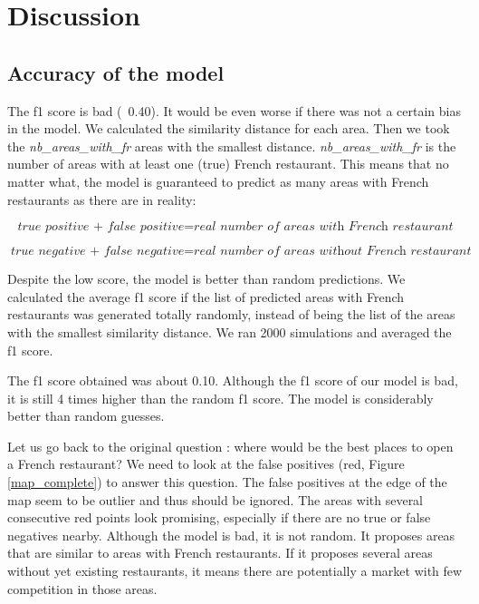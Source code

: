 \documentclass[12pt,a4paper]{article}
\begin{document}
\section{Discussion}

\subsection{Accuracy of the model}

The f1 score is bad (~0.40). It would be even worse if there was not a certain bias in the model. We calculated the similarity distance for each area. Then we took the \textit{nb\_areas\_with\_fr} areas with the smallest distance. \textit{nb\_areas\_with\_fr} is the number of areas with at least one (true) French restaurant. This means that no matter what, the model is guaranteed to predict as many areas with French restaurants as there are in reality:

\begin{equation}
	\textit{true positive + false positive} =  \textit{real number of areas with French restaurant}
\end{equation}

\begin{equation}
	\textit{true negative + false negative} =  \textit{real number of areas without French restaurant}
\end{equation}

Despite the low score, the model is better than random predictions. We calculated the average f1 score if the list of predicted areas with French restaurants was generated totally randomly, instead of being the list of the areas with the smallest similarity distance. We ran 2000 simulations and averaged the f1 score.

\medskip

The f1 score obtained was about 0.10. Although the f1 score of our model is bad, it is still 4 times higher than the random f1 score. The model is considerably better than random guesses. 

\medskip

Let us go back to the original question : where would be the best places to open a French restaurant? We need to look at the false positives (red, Figure \ref{map_complete}) to answer this question. The false positives at the edge of the map seem to be outlier and thus should be ignored. The areas with several consecutive red points look promising, especially if there are no true or false negatives nearby. Although the model is bad, it is not random. It proposes areas that are similar to areas with French restaurants. If it proposes several areas without yet existing restaurants, it means there are potentially a market with few competition in those areas.
\end{document}
